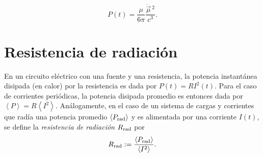 \begin{equation}\label{Pdipmag}
\boxed{P(t)=\frac{\mu}{6\pi}\frac{\ddot{\vec{\mu}}{\,}^2}{c^3}.}
\end{equation}

\section{Resistencia de radiación}

En un circuito eléctrico con una fuente y una resistencia, la potencia instantánea disipada (en calor) por la resistencia es dada por $P(t)=RI^2(t)$. Para el caso de corrientes periódicas, la potencia disipada promedio es entonces dada por $\left\langle P\right\rangle=R\left\langle I^2\right\rangle$.
Análogamente, en el caso de un sistema de cargas y corrientes que radía una potencia promedio $\left\langle P_{\rm rad}\right\rangle$ y es alimentada por una corriente $I(t)$, se define la \textit{resistencia de radiación} $R_{\rm rad}$ por
\begin{equation}
R_{\rm rad}:=\frac{\left\langle P_{\rm rad}\right\rangle}{\left\langle I^2\right\rangle}.
\end{equation}

